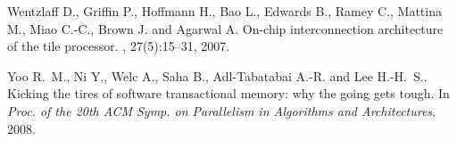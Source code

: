 \begin{thebibliography}{99}
{
Wentzlaff D., Griffin P., Hoffmann H., Bao L., Edwards B., Ramey C.,
  Mattina M., Miao C.-C., Brown J. and Agarwal A.
\newblock On-chip interconnection architecture of the tile processor.
, 27(5):15--31, 2007.


Yoo R.~M., Ni Y., Welc A., Saha B., Adl-Tabatabai A.-R. and
  Lee H.-H.~S..
\newblock Kicking the tires of software transactional memory: why the going
  gets tough.
\newblock In {\em Proc. of the 20th ACM Symp. on Parallelism in Algorithms and
  Architectures}, 2008.


























































































}
\end{thebibliography}

